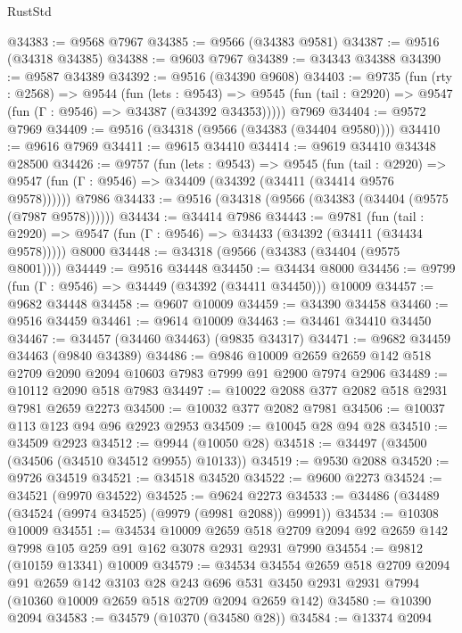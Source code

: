 \begin{lexlean}{RustStd}
\begin{coremodule}
@34383 := @9568 @7967
@34385 := @9566 (@34383 @9581)
@34387 := @9516 (@34318 @34385)
@34388 := @9603 @7967
@34389 := @34343 @34388
@34390 := @9587 @34389
@34392 := @9516 (@34390 @9608)
@34403 := @9735
    (fun (rty : @2568) =>
    @9544
      (fun (lets : @9543) =>
      @9545 (fun (tail : @2920) => @9547 (fun (Γ : @9546) => @34387 (@34392 @34353)))))
    @7969
@34404 := @9572 @7969
@34409 := @9516 (@34318 (@9566 (@34383 (@34404 @9580))))
@34410 := @9616 @7969
@34411 := @9615 @34410
@34414 := @9619 @34410 @34348 @28500
@34426 := @9757
    (fun (lets : @9543) =>
    @9545
      (fun (tail : @2920) =>
      @9547 (fun (Γ : @9546) => @34409 (@34392 (@34411 (@34414 @9576 @9578))))))
    @7986
@34433 := @9516 (@34318 (@9566 (@34383 (@34404 (@9575 (@7987 @9578))))))
@34434 := @34414 @7986
@34443 := @9781
    (fun (tail : @2920) => @9547 (fun (Γ : @9546) => @34433 (@34392 (@34411 (@34434 @9578)))))
    @8000
@34448 := @34318 (@9566 (@34383 (@34404 (@9575 @8001))))
@34449 := @9516 @34448
@34450 := @34434 @8000
@34456 := @9799 (fun (Γ : @9546) => @34449 (@34392 (@34411 @34450))) @10009
@34457 := @9682 @34448
@34458 := @9607 @10009
@34459 := @34390 @34458
@34460 := @9516 @34459
@34461 := @9614 @10009
@34463 := @34461 @34410 @34450
@34467 := @34457 (@34460 @34463) (@9835 @34317)
@34471 := @9682 @34459 @34463 (@9840 @34389)
@34486 := @9846
    @10009
    @2659
    @2659
    @142
    @518
    @2709
    @2090
    @2094
    @10603
    @7983
    @7999
    @91
    @2900
    @7974
    @2906
@34489 := @10112 @2090 @518 @7983
@34497 := @10022 @2088 @377 @2082 @518 @2931 @7981 @2659 @2273
@34500 := @10032 @377 @2082 @7981
@34506 := @10037 @113 @123 @94 @96 @2923 @2953
@34509 := @10045 @28 @94 @28
@34510 := @34509 @2923
@34512 := @9944 (@10050 @28)
@34518 := @34497 (@34500 (@34506 (@34510 @34512 @9955) @10133))
@34519 := @9530 @2088
@34520 := @9726 @34519
@34521 := @34518 @34520
@34522 := @9600 @2273
@34524 := @34521 (@9970 @34522)
@34525 := @9624 @2273
@34533 := @34486 (@34489 (@34524 (@9974 @34525) (@9979 (@9981 @2088)) @9991))
@34534 := @10308 @10009
@34551 := @34534
    @10009
    @2659
    @518
    @2709
    @2094
    @92
    @2659
    @142
    @7998
    @105
    @259
    @91
    @162
    @3078
    @2931
    @2931
    @7990
@34554 := @9812 (@10159 @13341) @10009
@34579 := @34534
    @34554
    @2659
    @518
    @2709
    @2094
    @91
    @2659
    @142
    @3103
    @28
    @243
    @696
    @531
    @3450
    @2931
    @2931
    @7994
    (@10360 @10009 @2659 @518 @2709 @2094 @2659 @142)
@34580 := @10390 @2094
@34583 := @34579 (@10370 (@34580 @28))
@34584 := @13374 @2094

\end{coremodule}
\end{lexlean}

